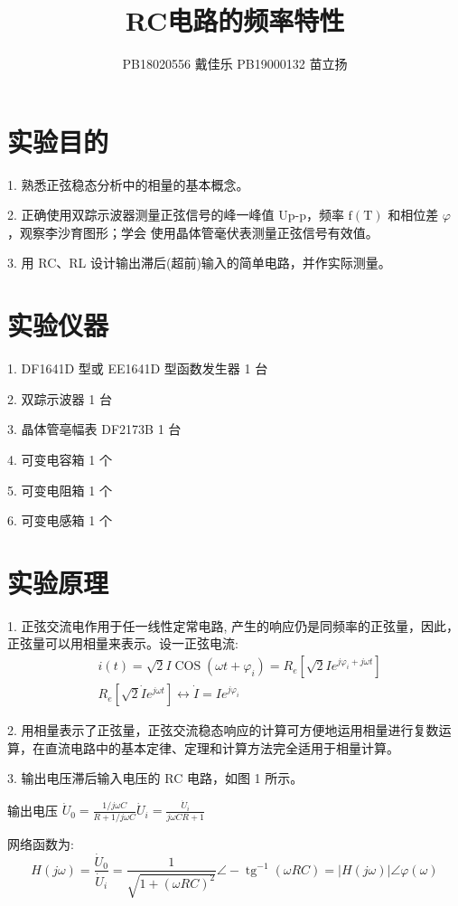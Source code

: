 \documentclass[lang=cn,11pt]{elegantpaper}
\title{RC电路的频率特性}
\author{PB18020556 戴佳乐 PB19000132 苗立扬}
\date{}
\begin{document}
\maketitle

\section{实验目的}
1. 熟悉正弦稳态分析中的相量的基本概念。

2. 正确使用双踪示波器测量正弦信号的峰一峰值 Up-p，频率 $\mathrm{f}(\mathrm{T})$ 和相位差 $\varphi$，观察李沙育图形；学会 使用晶体管毫伏表测量正弦信号有效值。

3. 用 RC、RL 设计输出滞后(超前)输入的简单电路，并作实际测量。

\section{实验仪器}
1. DF1641D 型或 EE1641D 型函数发生器 1 台

2. 双踪示波器 1 台

3. 晶体管亳幅表 DF2173B 1 台

4. 可变电容箱 1 个

5. 可变电阻箱 1 个

6. 可变电感箱 1 个

\section{实验原理}
1. 正弦交流电作用于任一线性定常电路, 产生的响应仍是同频率的正弦量，因此，正弦量可以用相量来表示。设一正弦电流:
$$
\begin{aligned}
&i(t)=\sqrt{2} I \operatorname{COS}\left(\omega t+\varphi_{i}\right)=R_{e}\left[\sqrt{2} I e^{j \varphi_{i}+j \omega t}\right] \\
&R_{e}\left[\sqrt{2} \dot{I} e^{j \omega t}\right] \leftrightarrow \dot{I}=I e^{j \varphi_{i}}
\end{aligned}
$$

2. 用相量表示了正弦量，正弦交流稳态响应的计算可方便地运用相量进行复数运算，在直流电路中的基本定律、定理和计算方法完全适用于相量计算。

3. 输出电压滞后输入电压的 RC 电路，如图 1 所示。

输出电压 $\dot{U}_{0}=\frac{1 / j \omega C}{R+1 / j \omega C} \dot{U}_{i}=\frac{\dot{U}_{i}}{j \omega C R+1}$

网络函数为:
$$
H(j \omega)=\frac{\dot{U}_{0}}{\dot{U}_{i}}=\frac{1}{\sqrt{1+(\omega R C)^{2}}} \angle-\operatorname{tg}^{-1}(\omega R C)=|H(j \omega)| \angle \varphi(\omega)
$$
\end{document}
